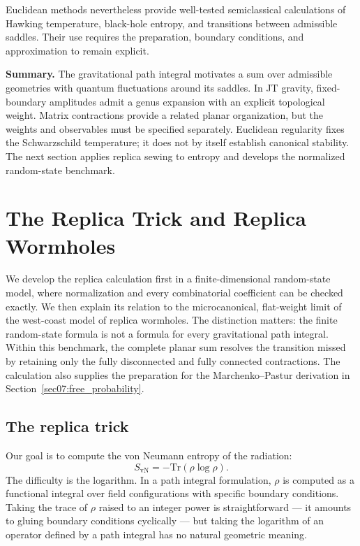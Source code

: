 \documentclass[11pt,letterpaper]{article}
\theoremstyle{plain}
\theoremstyle{definition}
\theoremstyle{remark}
\begin{document}
Euclidean methods nevertheless provide well-tested semiclassical
calculations of Hawking temperature, black-hole entropy, and transitions
between admissible saddles. Their use requires the preparation, boundary
conditions, and approximation to remain explicit.

\bigskip
\noindent\textbf{Summary.} The gravitational path integral motivates a sum
over admissible geometries with quantum fluctuations around its saddles.
In JT gravity, fixed-boundary amplitudes admit a genus expansion with an
explicit topological weight. Matrix contractions provide a related planar
organization, but the weights and observables must be specified separately.
Euclidean regularity fixes the Schwarzschild temperature; it does not by
itself establish canonical stability. The next section applies replica
sewing to entropy and develops the normalized random-state benchmark.


\section{The Replica Trick and Replica Wormholes}
\label{sec06:replica_wormholes}

We develop the replica calculation first in a finite-dimensional random-state
model, where normalization and every combinatorial coefficient can be checked
exactly.  We then explain its relation to the microcanonical, flat-weight limit
of the west-coast model of replica wormholes.  The distinction matters: the
finite random-state formula is not a formula for every gravitational path
integral.  Within this benchmark, the complete planar sum resolves the
transition missed by retaining only the fully disconnected and fully connected
contractions.  The calculation also supplies the preparation for the
Marchenko--Pastur derivation in Section~\ref{sec07:free_probability}.

\subsection{The replica trick}
\label{subsec06:replica_trick}

Our goal is to compute the von Neumann entropy of the radiation:
\begin{equation}
\label{eq06:svn_target}
S_{\mathrm{vN}} = -\mathrm{Tr}(\rho \log \rho).
\end{equation}
The difficulty is the logarithm.  In a path integral formulation, $\rho$ is
computed as a functional integral over field configurations with specific
boundary conditions.  Taking the trace of $\rho$ raised to an integer power is
straightforward --- it amounts to gluing boundary conditions cyclically --- but
taking the logarithm of an operator defined by a path integral has no natural
geometric meaning.
\end{document}
